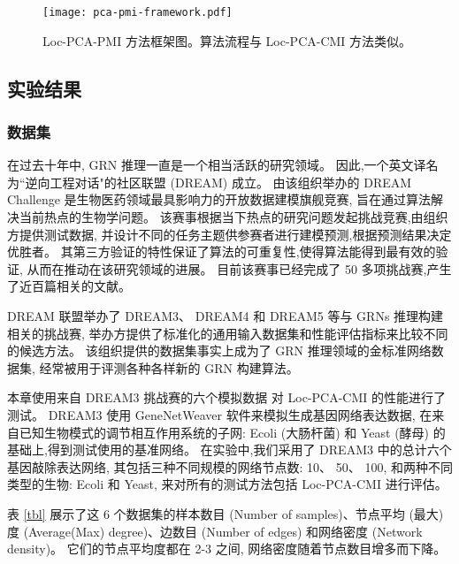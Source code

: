 \begin{figure}[!htbp]
  \centering
  \texttt{[image: pca-pmi-framework.pdf]}
  \caption{Loc-PCA-PMI 方法框架图。算法流程与 Loc-PCA-CMI 方法类似。}
  \label{pca-pmi-fr}
\end{figure}


\subsection{实验结果}

\subsubsection{数据集}

在过去十年中, GRN 推理一直是一个相当活跃的研究领域。
因此,一个英文译名为``逆向工程对话"的社区联盟 (DREAM)  成立。
由该组织举办的 DREAM Challenge 是生物医药领域最具影响力的开放数据建模旗舰竞赛,
旨在通过算法解决当前热点的生物学问题。
该赛事根据当下热点的研究问题发起挑战竞赛,由组织方提供测试数据,
并设计不同的任务主题供参赛者进行建模预测,根据预测结果决定优胜者。
其第三方验证的特性保证了算法的可重复性,使得算法能得到最有效的验证,
从而在推动在该研究领域的进展。
目前该赛事已经完成了 50 多项挑战赛,产生了近百篇相关的文献。

DREAM 联盟举办了 DREAM3、
DREAM4 和 DREAM5 等与 GRNs 推理构建相关的挑战赛, 
举办方提供了标准化的通用输入数据集和性能评估指标来比较不同的候选方法。
该组织提供的数据集事实上成为了 GRN 推理领域的金标准网络数据集,
经常被用于评测各种各样新的 GRN 构建算法。

本章使用来自 DREAM3 挑战赛的六个模拟数据  对 Loc-PCA-CMI 的性能进行了测试。
 DREAM3 使用 GeneNetWeaver 软件来模拟生成基因网络表达数据,
在来自已知生物模式的调节相互作用系统的子网:
 Ecoli (大肠杆菌) 和 Yeast (酵母) 的基础上,得到测试使用的基准网络。 
在实验中,我们采用了 DREAM3 中的总计六个基因敲除表达网络,
其包括三种不同规模的网络节点数: 10、 50、 100, 和两种不同类型的生物: Ecoli 和 Yeast, 
来对所有的测试方法包括 Loc-PCA-CMI 进行评估。

表 \ref{tbl} 展示了这 6 个数据集的样本数目 (Number of samples)、节点平均 (最大)度 (Average(Max) degree)、边数目 (Number of edges) 和网络密度 (Network density)。
它们的节点平均度都在 2-3 之间, 网络密度随着节点数目增多而下降。

